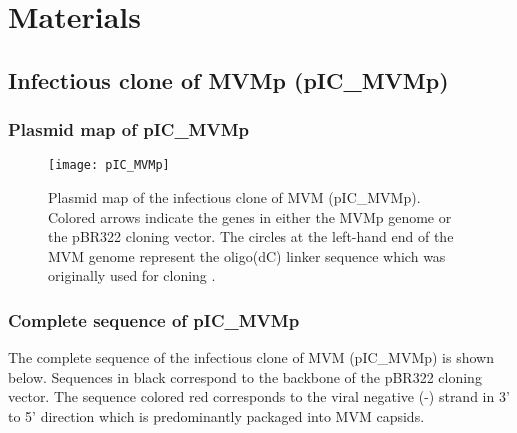 
\chapter{Materials} %

\label{Materials} %


\section{Infectious clone of MVMp (pIC\_MVMp)}
\label{IC}


\subsection{Plasmid map of pIC\_MVMp}

\begin{figure}[h] 
\begin{center}
\texttt{[image: pIC\_MVMp]}
\caption[Plasmid map of the infectious clone of MVMp]{Plasmid map of the infectious clone of MVM (pIC\_MVMp). Colored arrows indicate the genes in either the MVMp genome or the pBR322 cloning vector. The circles at the left-hand end of the MVM genome represent the oligo(dC) linker sequence which was originally used for cloning \cite{pmid6345805}.}
\label{pIC}
\end{center}
\end{figure}

\newpage

\subsection{Complete sequence of pIC\_MVMp}
\label{sequence}

\raggedright
The complete sequence of the infectious clone of MVM (pIC\_MVMp) is shown below. Sequences in black correspond to the backbone of the pBR322 cloning vector. The sequence colored red corresponds to the viral negative (-) strand in 3' to 5' direction which is predominantly packaged into MVM capsids.  


